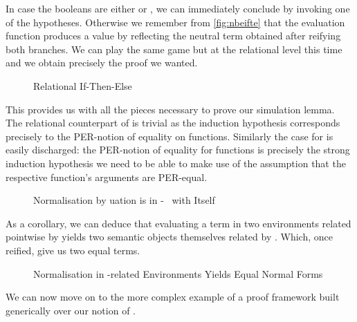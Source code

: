 In case the booleans are either  or , we can immediately conclude
by invoking one of the hypotheses. Otherwise we remember from \cref{fig:nbeifte}
that the evaluation function
produces a value by reflecting the neutral term obtained after reifying both branches.
We can play the same game but at the relational level this time and we obtain precisely
the proof we wanted.

\begin{figure}[h]
\caption{Relational If-Then-Else\label{fig:nbeiftenelser}}
\end{figure}

This provides us with all the pieces necessary to prove our simulation lemma. The relational
counterpart of  is trivial as the induction hypothesis corresponds precisely to
the PER-notion of equality on functions. Similarly the case for  is easily discharged:
the PER-notion of equality for functions is precisely the strong induction hypothesis we need
to be able to make use of the assumption that the respective function's arguments are PER-equal.

\begin{figure}[h]
\caption{Normalisation by uation is in -~ with Itself\label{fig:nbeselfsim}}
\end{figure}

As a corollary, we can deduce that evaluating a term in two environments related pointwise
by  yields two semantic objects themselves related by . Which, once reified,
give us two equal terms.

\begin{figure}[h]
\caption{Normalisation in -related Environments Yields Equal Normal Forms}\label{fig:normequals}
\end{figure}

We can now move on to the more complex example of a proof framework built generically
over our notion of .
